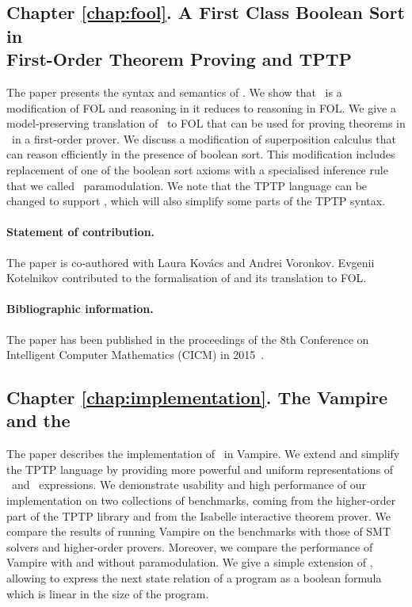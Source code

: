 \subsection*{Chapter \ref{chap:fool}. A First Class Boolean Sort in\\First-Order Theorem Proving and TPTP}
The paper presents the syntax and semantics of \folb. We show that \folb\ is a modification of FOL and reasoning in it reduces to reasoning in FOL. We give a model-preserving \iffalse(modulo introduced definitions)\fi translation of \folb\ to FOL that can be used for proving theorems in \folb\ in a first-order prover. We discuss a modification of superposition calculus that can reason efficiently in the presence of boolean sort. This modification includes replacement of one of the boolean sort axioms with a specialised inference rule that we called \folb\ paramodulation. We note that the TPTP language can be changed to support \folb, which will also simplify some parts of the TPTP syntax. 

\paragraph{Statement of contribution.} The paper is co-authored with Laura Kov\'{a}cs and Andrei Voronkov. Evgenii Kotelnikov contributed to the formalisation of \folb{} and its translation to FOL.

\paragraph{Bibliographic information.} The paper has been published in the proceedings of the 8th Conference on Intelligent Computer Mathematics (CICM) in 2015~\cite{FOOL}.

\subsection*{Chapter \ref{chap:implementation}. The Vampire and the \folb{}}
The paper describes the implementation of \folb\ in Vampire. We extend and simplify the TPTP language by providing more powerful and uniform representations of \ITE\ and \LETIN\ expressions. We demonstrate usability and high performance of our implementation on two collections of benchmarks, coming from the higher-order part of the TPTP library and from the Isabelle interactive theorem prover. We compare the results of running Vampire on the benchmarks with those of SMT solvers and higher-order provers. Moreover, we compare the performance of Vampire with and without \folb{} paramodulation. We give a simple extension of \folb, allowing to express the next state relation of a program as a boolean formula which is linear in the size of the program.

